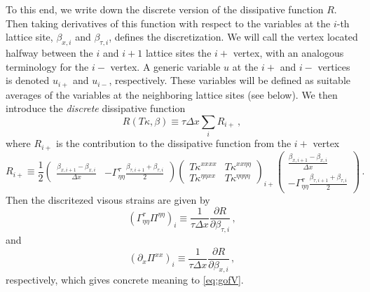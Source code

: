 \documentclass[12pt,aps,preprint,nofootinbib,noshowkeys,noshowpacs,longbibliography,superscriptaddress,tightenlines]{revtex4-2}
\def\st{\begin{equation}}
\def\stp{\end{equation}}
\def\tvisc{\Pi}
\begin{document}
To this end, we write down the discrete version of the dissipative function $R$. Then   
 taking derivatives of this function with respect to the variables at the $i$-th lattice site, $\beta_{x, i}$ and
$\beta_{\tau, i}$,  defines the discretization.  We will call the vertex located
halfway between the $i$ and $i{+}1$ lattice sites the $i+$ vertex, with an
analogous terminology for the $i-$ vertex. 
A generic variable $u$ at the $i+$ and $i-$ vertices is denoted  $u_{i+}$ and $u_{i-}$,  respectively.  These variables will be defined
as suitable averages  of the variables at the neighboring lattice sites (see
below). 
  We then introduce the \emph{discrete} dissipative function
  \st
  R(T\kappa, \beta) \equiv \tau\Delta x\sum_{i} R_{i+}  \, , 
  \stp 
  where $R_{i+}$ is the contribution to the dissipative function from the $i+$ vertex
  \begin{equation}
  R_{i+} \equiv \frac{1}{2}
\begin{pmatrix}
  \frac{\beta_{x, i+1} - \beta_{x,i}}{\Delta x}  &   -\Gamma^{\tau}_{\eta\eta} \frac{\beta_{\tau, i+1} + \beta_{\tau, i} }{2}
\end{pmatrix}
 \begin{pmatrix}
   T\kappa^{xxxx}   &  T \kappa^{xx\eta\eta} \\
   T\kappa^{\eta\eta xx}   &  T\kappa^{\eta\eta\eta\eta}
 \end{pmatrix}_{i+}
\begin{pmatrix}
  \frac{\beta_{x, i+1} - \beta_{x, i}}{\Delta x}  \\[0.5em]   -\Gamma^{\tau}_{\eta\eta} \frac{\beta_{\tau, i+1} + \beta_{\tau, i} }{2}
\end{pmatrix} \, .
\end{equation}
Then  the discritezed visous strains are given by
\st
(\Gamma^{\tau}_{\eta\eta} \tvisc^{\eta\eta})_i \equiv  
\frac{1}{\tau\Delta x}\frac{\partial R }{\partial \beta_{\tau, i}}  \, , 
\stp
and
\st
(\partial_x \tvisc^{xx})_i\equiv  \frac{1}{\tau\Delta x}\frac{\partial R }{\partial \beta_{x, i}} \, , 
\stp
respectively, which gives  concrete meaning to \cref{eq:gofV}. 
\end{document}
